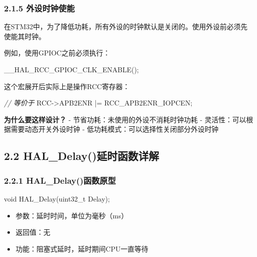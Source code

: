 \documentclass[
  chinese,
  UTF8,
  oneside,
  openany]{ctexbook}
\newenvironment{Shaded}{}{}
\newcommand{\CommentTok}[1]{\textcolor[rgb]{0.38,0.63,0.69}{\textit{#1}}}
\newcommand{\DataTypeTok}[1]{\textcolor[rgb]{0.56,0.13,0.00}{#1}}
\newcommand{\NormalTok}[1]{#1}
\newcommand{\OperatorTok}[1]{\textcolor[rgb]{0.40,0.40,0.40}{#1}}
\providecommand{\tightlist}{%
  \setlength{\itemsep}{0pt}\setlength{\parskip}{0pt}}
\begin{document}
\subsubsection{2.1.5
外设时钟使能}\label{ux5916ux8bbeux65f6ux949fux4f7fux80fd}

在STM32中，为了降低功耗，所有外设的时钟默认是关闭的。使用外设前必须先使能其时钟。

例如，使用GPIOC之前必须执行：

\begin{Shaded}
\begin{Highlighting}[]
\NormalTok{\_\_HAL\_RCC\_GPIOC\_CLK\_ENABLE}\OperatorTok{();}
\end{Highlighting}
\end{Shaded}

这个宏展开后实际上是操作RCC寄存器：

\begin{Shaded}
\begin{Highlighting}[]
\CommentTok{// 等价于}
\NormalTok{RCC}\OperatorTok{{-}\textgreater{}}\NormalTok{APB2ENR }\OperatorTok{|=}\NormalTok{ RCC\_APB2ENR\_IOPCEN}\OperatorTok{;}
\end{Highlighting}
\end{Shaded}

\textbf{为什么要这样设计？} - 节省功耗：未使用的外设不消耗时钟功耗 -
灵活性：可以根据需要动态开关外设时钟 -
低功耗模式：可以选择性关闭部分外设时钟

\subsection{2.2
HAL\_Delay()延时函数详解}\label{hal_delayux5ef6ux65f6ux51fdux6570ux8be6ux89e3}

\subsubsection{2.2.1
HAL\_Delay()函数原型}\label{hal_delayux51fdux6570ux539fux578b}

\begin{Shaded}
\begin{Highlighting}[]
\DataTypeTok{void}\NormalTok{ HAL\_Delay}\OperatorTok{(}\DataTypeTok{uint32\_t}\NormalTok{ Delay}\OperatorTok{);}
\end{Highlighting}
\end{Shaded}

\begin{itemize}
\tightlist
\item
  参数：延时时间，单位为毫秒（ms）
\item
  返回值：无
\item
  功能：阻塞式延时，延时期间CPU一直等待
\end{itemize}
\end{document}
